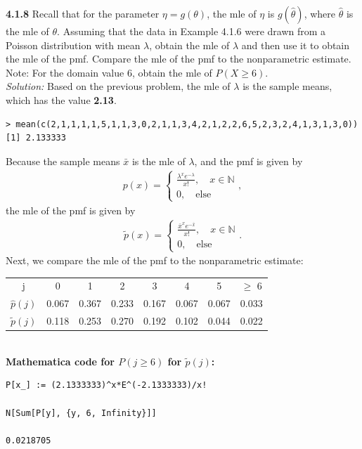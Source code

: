 \documentclass{book}
\theoremstyle{definition}
\newcommand{\Else}{\text{else}}
\newcommand{\f}[2]{\frac{#1}{#2}}
\begin{document}
\newpage
\noindent \textbf{4.1.8} Recall that for the parameter $\eta = g(\theta)$, the mle of $\eta$ is $g(\hat{\theta})$, where $\hat{\theta}$ is the mle of $\theta$. Assuming that the data in Example 4.1.6 were drawn from a Poisson distribution with mean $\lambda$, obtain the mle of $\lambda$ and then use it to obtain the mle of the pmf. Compare the mle of the pmf to the nonparametric estimate. Note: For the domain value 6, obtain the mle of $P(X \geq 6)$.\\

\noindent \textit{Solution:} Based on the previous problem, the mle of $\lambda$ is the sample means, which has the value \textbf{2.13}.
\begin{lstlisting}
> mean(c(2,1,1,1,1,5,1,1,3,0,2,1,1,3,4,2,1,2,2,6,5,2,3,2,4,1,3,1,3,0))
[1] 2.133333
\end{lstlisting}
Because the sample means $\bar{x}$ is the mle of $\lambda$, and the pmf is given by
\begin{align}
p(x) = \begin{cases}
\f{\lambda^x e^{-\lambda}}{x!}, \quad x \in \mathbb{N}\\ 
0, \quad \Else
\end{cases},
\end{align}
the mle of the pmf is given by
\begin{align}
\tilde{p}(x) = \begin{cases}
\f{\bar{x}^x e^{-\bar{x}}}{x!}, \quad x \in \mathbb{N}\\ 
0, \quad \Else
\end{cases}.
\end{align}
Next, we compare the mle of the pmf to the nonparametric estimate:\\

\begin{tabular}{ c c c c c c c c}
	j & 0 &1& 2& 3& 4& 5& $\geq$ 6 \\
	$\hat{p}(j)$& 0.067 & 0.367 & 0.233 & 0.167 & 0.067 & 0.067 & 0.033\\
	$\tilde{p}(j)$ & 0.118 & 0.253 & 0.270  & 0.192  & 0.102 & 0.044  &  0.022
\end{tabular}\\


\textbf{Mathematica code for $P(j \geq 6)$ for $\tilde{p}(j)$:}
\begin{lstlisting}
P[x_] := (2.1333333)^x*E^(-2.1333333)/x!

N[Sum[P[y], {y, 6, Infinity}]]

0.0218705
\end{lstlisting}
\end{document}
